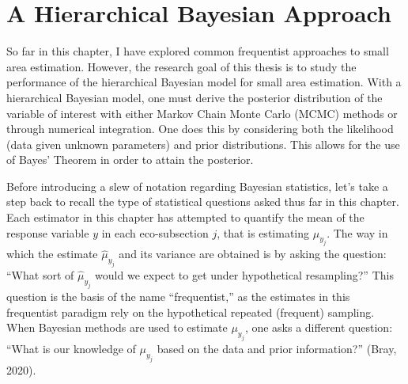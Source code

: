 \documentclass[12pt,twoside]{reedthesis}
\begin{document}
\hypertarget{a-hierarchical-bayesian-approach}{%
\section{A Hierarchical Bayesian Approach}\label{a-hierarchical-bayesian-approach}}

So far in this chapter, I have explored common frequentist approaches to small area estimation. However, the research goal of this thesis is to study the performance of the hierarchical Bayesian model for small area estimation. With a hierarchical Bayesian model, one must derive the posterior distribution of the variable of interest with either Markov Chain Monte Carlo (MCMC) methods or through numerical integration. One does this by considering both the likelihood (data given unknown parameters) and prior distributions. This allows for the use of Bayes' Theorem in order to attain the posterior.

Before introducing a slew of notation regarding Bayesian statistics, let's take a step back to recall the type of statistical questions asked thus far in this chapter. Each estimator in this chapter has attempted to quantify the mean of the response variable \(y\) in each eco-subsection \(j\), that is estimating \(\mu_{y_j}\). The way in which the estimate \(\hat\mu_{y_j}\) and its variance are obtained is by asking the question: ``What sort of \(\hat\mu_{y_j}\) would we expect to get under hypothetical resampling?'' This question is the basis of the name ``frequentist,'' as the estimates in this frequentist paradigm rely on the hypothetical repeated (frequent) sampling. When Bayesian methods are used to estimate \(\mu_{y_j}\), one asks a different question: ``What is our knowledge of \(\mu_{y_j}\) based on the data and prior information?'' (Bray, 2020).
\end{document}
